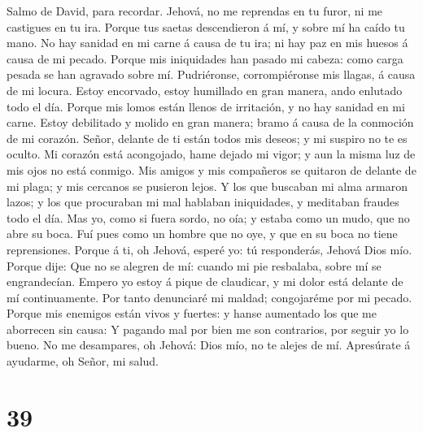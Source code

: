 Salmo de David, para recordar. Jehová, no me reprendas en
tu furor, ni me castigues en tu ira.  Porque tus saetas
descendieron á mí, y sobre mí ha caído tu mano.  No hay
sanidad en mi carne á causa de tu ira; ni hay paz en mis huesos á causa
de mi pecado.  Porque mis iniquidades han pasado mi
cabeza: como carga pesada se han agravado sobre mí. 
Pudriéronse, corrompiéronse mis llagas, á causa de mi locura.
 Estoy encorvado, estoy humillado en gran manera, ando
enlutado todo el día.  Porque mis lomos están llenos de
irritación, y no hay sanidad en mi carne.  Estoy
debilitado y molido en gran manera; bramo á causa de la conmoción de mi
corazón.  Señor, delante de ti están todos mis deseos; y
mi suspiro no te es oculto.  Mi corazón está acongojado,
hame dejado mi vigor; y aun la misma luz de mis ojos no está conmigo.
 Mis amigos y mis compañeros se quitaron de delante de mi
plaga; y mis cercanos se pusieron lejos.  Y los que
buscaban mi alma armaron lazos; y los que procuraban mi mal hablaban
iniquidades, y meditaban fraudes todo el día.  Mas yo,
como si fuera sordo, no oía; y estaba como un mudo, que no abre su boca.
 Fuí pues como un hombre que no oye, y que en su boca no
tiene reprensiones.  Porque á ti, oh Jehová, esperé yo:
tú responderás, Jehová Dios mío.  Porque dije: Que no se
alegren de mí: cuando mi pie resbalaba, sobre mí se engrandecían.
 Empero yo estoy á pique de claudicar, y mi dolor está
delante de mí continuamente.  Por tanto denunciaré mi
maldad; congojaréme por mi pecado.  Porque mis enemigos
están vivos y fuertes: y hanse aumentado los que me aborrecen sin causa:
 Y pagando mal por bien me son contrarios, por seguir yo
lo bueno.  No me desampares, oh Jehová: Dios mío, no te
alejes de mí.  Apresúrate á ayudarme, oh Señor, mi salud.

\hypertarget{section-38}{%
\section{39}\label{section-38}}

